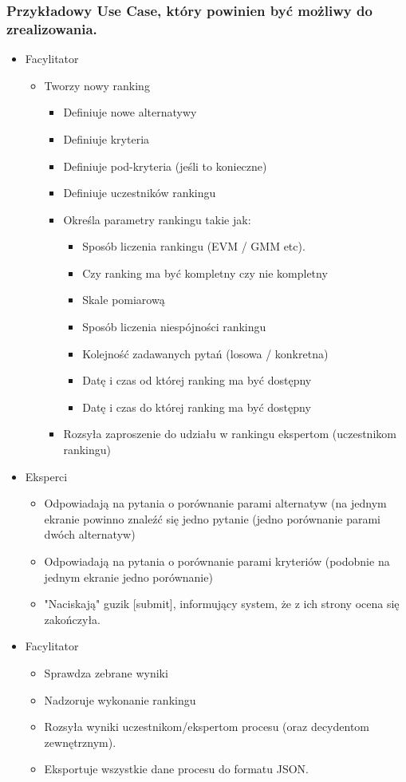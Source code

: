 \documentclass{article}
\begin{document}
\subsubsection{Przykładowy Use Case, który powinien być możliwy do zrealizowania.}
\begin{itemize}
\item Facylitator
	\begin{itemize}
        \item Tworzy nowy ranking
		\begin{itemize}
            \item Definiuje nowe alternatywy
            \item Definiuje kryteria
            \item Definiuje pod-kryteria (jeśli to konieczne)
            \item Definiuje uczestników rankingu
            \item Określa parametry rankingu takie jak:
			\begin{itemize}
                \item Sposób liczenia rankingu (EVM / GMM etc).
                \item Czy ranking ma być kompletny czy nie kompletny
                \item Skale pomiarową
                \item Sposób liczenia niespójności rankingu
                \item Kolejność zadawanych pytań (losowa / konkretna)
                \item Datę i czas od której ranking ma być dostępny
                \item Datę i czas do której ranking ma być dostępny
			\end{itemize}
            \item Rozsyła zaproszenie do udziału w rankingu ekspertom (uczestnikom rankingu)
		\end{itemize}
	\end{itemize}
\item    Eksperci
	\begin{itemize}
        \item Odpowiadają na pytania o porównanie parami alternatyw (na jednym ekranie powinno znaleźć się jedno pytanie (jedno porównanie parami dwóch alternatyw)
        \item Odpowiadają na pytania o porównanie parami kryteriów (podobnie na jednym ekranie jedno porównanie)
        \item "Naciskają" guzik [submit], informujący system, że z ich strony ocena się zakończyła.
	\end{itemize}
\item    Facylitator
	\begin{itemize}
        \item Sprawdza zebrane wyniki
        \item Nadzoruje wykonanie rankingu
        \item Rozsyła wyniki uczestnikom/ekspertom procesu (oraz decydentom zewnętrznym).
        \item Eksportuje wszystkie dane procesu do formatu JSON. 
	\end{itemize}
\end{itemize}
\end{document}
